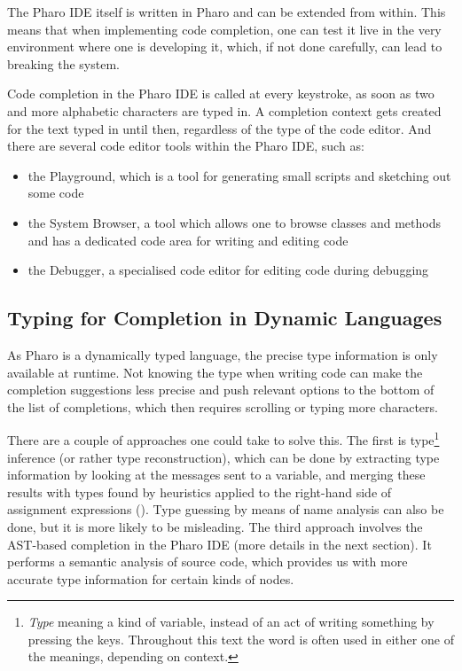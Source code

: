 \documentclass[sigplan,screen]{acmart}
\begin{document}
The Pharo IDE itself is written in Pharo and can be extended from within. This means that when implementing code completion, one can test it live in the very environment where one is developing it, which, if not done carefully, can lead to breaking the system.

Code completion in the Pharo IDE is called at every keystroke, as soon as two and more alphabetic characters are typed in. A completion context gets created for the text typed in until then, regardless of the type of the code editor. And there are several code editor tools within the Pharo IDE, such as:
\begin{itemize}
    \item the Playground, which is a tool for generating small scripts and sketching out some code
    \item the System Browser, a tool which allows one to browse classes and methods and has a dedicated code area for writing and editing code
    \item the Debugger, a specialised code editor for editing code during debugging
\end{itemize}

\subsection{Typing for Completion in Dynamic Languages}
As Pharo is a dynamically typed language, the precise type information is only available at runtime. Not knowing the type when writing code can make the completion suggestions less precise and push relevant options to the bottom of the list of completions, which then requires scrolling or typing more characters.

There are a couple of approaches one could take to solve this. The first is type\footnote{\textit{Type} meaning a kind of variable, instead of an act of writing something by pressing the keys. Throughout this text the word is often used in either one of the meanings, depending on context.} inference (or rather type reconstruction), which can be done by extracting type information by looking at the messages sent to a variable, and merging these results with types found by heuristics applied to the right-hand side of assignment expressions (\cite{Pluq09a}). Type guessing by means of name analysis can also be done, but it is more likely to be misleading. The third approach involves the AST-based completion in the Pharo IDE (more details in the next section). It performs a semantic analysis of source code, which provides us with more accurate type information for certain kinds of nodes.
\end{document}
